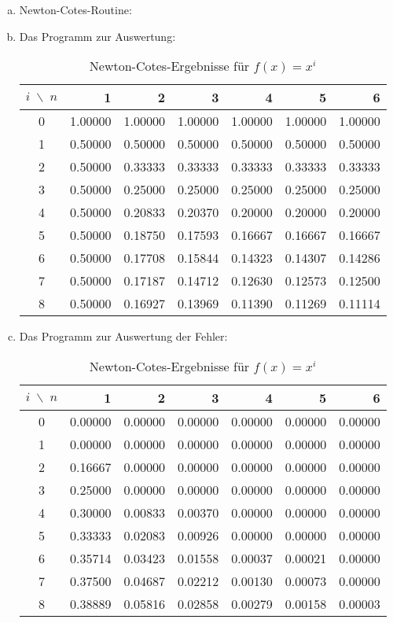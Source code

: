 \documentclass{mywork}
\begin{document}
\begin{aufgabe}
	\begin{enumerate}[a)]
		\item
			Newton-Cotes-Routine:
			
		\item
			Das Programm zur Auswertung:
			
			\begin{table}[h]
				\centering
				\caption{Newton-Cotes-Ergebnisse für $f(x)=x^i$}
				\begin{tabular}{c|rrrrrr}
					$i \;\backslash\; n$ & 1 & 2 & 3 & 4 & 5 & 6 \\ \hline
0 &  1.00000 & 1.00000 & 1.00000 & 1.00000 & 1.00000 & 1.00000 \\
1 &  0.50000 & 0.50000 & 0.50000 & 0.50000 & 0.50000 & 0.50000\\
2 &  0.50000 & 0.33333 & 0.33333 & 0.33333 & 0.33333 & 0.33333\\
3 &  0.50000 & 0.25000 & 0.25000 & 0.25000 & 0.25000 & 0.25000\\
4 &  0.50000 & 0.20833 & 0.20370 & 0.20000 & 0.20000 & 0.20000\\
5 &  0.50000 & 0.18750 & 0.17593 & 0.16667 & 0.16667 & 0.16667\\
6 &  0.50000 & 0.17708 & 0.15844 & 0.14323 & 0.14307 & 0.14286\\
7 &  0.50000 & 0.17187 & 0.14712 & 0.12630 & 0.12573 & 0.12500\\
8 &  0.50000 & 0.16927 & 0.13969 & 0.11390 & 0.11269 & 0.11114\\
				\end{tabular}
			\end{table}
			\newpage
		\item
			Das Programm zur Auswertung der Fehler:
			
			\begin{table}[h]
				\centering
				\caption{Newton-Cotes-Ergebnisse für $f(x)=x^i$}
				\begin{tabular}{c|rrrrrr}
					$i \;\backslash\; n$ & 1 & 2 & 3 & 4 & 5 & 6 \\ \hline
0 &  0.00000 & 0.00000 & 0.00000 & 0.00000 & 0.00000 & 0.00000\\
1 &  0.00000 & 0.00000 & 0.00000 & 0.00000 & 0.00000 & 0.00000\\
2 &  0.16667 & 0.00000 & 0.00000 & 0.00000 & 0.00000 & 0.00000\\
3 &  0.25000 & 0.00000 & 0.00000 & 0.00000 & 0.00000 & 0.00000\\
4 &  0.30000 & 0.00833 & 0.00370 & 0.00000 & 0.00000 & 0.00000\\
5 &  0.33333 & 0.02083 & 0.00926 & 0.00000 & 0.00000 & 0.00000\\
6 &  0.35714 & 0.03423 & 0.01558 & 0.00037 & 0.00021 & 0.00000\\
7 &  0.37500 & 0.04687 & 0.02212 & 0.00130 & 0.00073 & 0.00000\\
8 &  0.38889 & 0.05816 & 0.02858 & 0.00279 & 0.00158 & 0.00003\\
				\end{tabular}
			\end{table}


\end{enumerate}
\end{aufgabe}
\end{document}
